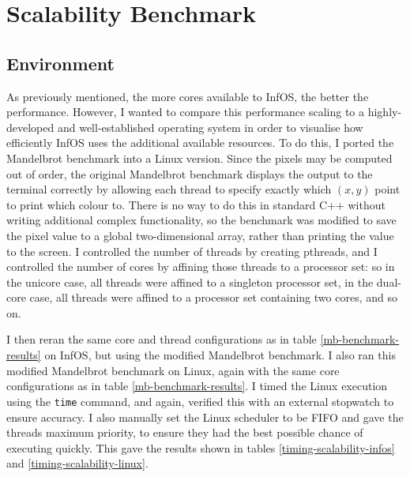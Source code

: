 \documentclass[bsc,frontabs,singlespacing,parskip,deptreport]{infthesis}
\begin{document}
\section{Scalability Benchmark}
\label{mb-mod-benchmark}
\subsection{Environment} 
As previously mentioned, the more cores available to InfOS, the better the performance. However, I wanted to compare this performance scaling to a highly-developed and well-established operating system in order to visualise how efficiently InfOS uses the additional available resources. To do this, I ported the Mandelbrot benchmark into a Linux version. Since the pixels may be computed out of order, the original Mandelbrot benchmark displays the output to the terminal correctly by allowing each thread to specify exactly which $(x,y)$ point to print which colour to. There is no way to do this in standard C++ without writing additional complex functionality, so the benchmark was modified to save the pixel value to a global two-dimensional array, rather than printing the value to the screen. I controlled the number of threads by creating pthreads, and I controlled the number of cores by affining those threads to a processor set: so in the unicore case, all threads were affined to a singleton processor set, in the dual-core case, all threads were affined to a processor set containing two cores, and so on.


I then reran the same core and thread configurations as in table \ref{mb-benchmark-results} on InfOS, but using the modified Mandelbrot benchmark. I also ran this modified Mandelbrot benchmark on Linux, again with the same core configurations as in table \ref{mb-benchmark-results}. I timed the Linux execution using the \verb|time| command, and again, verified this with an external stopwatch to ensure accuracy. I also manually set the Linux scheduler to be FIFO and gave the threads maximum priority, to ensure they had the best possible chance of executing quickly. This gave the results shown in tables \ref{timing-scalability-infos} and \ref{timing-scalability-linux}.
\end{document}

